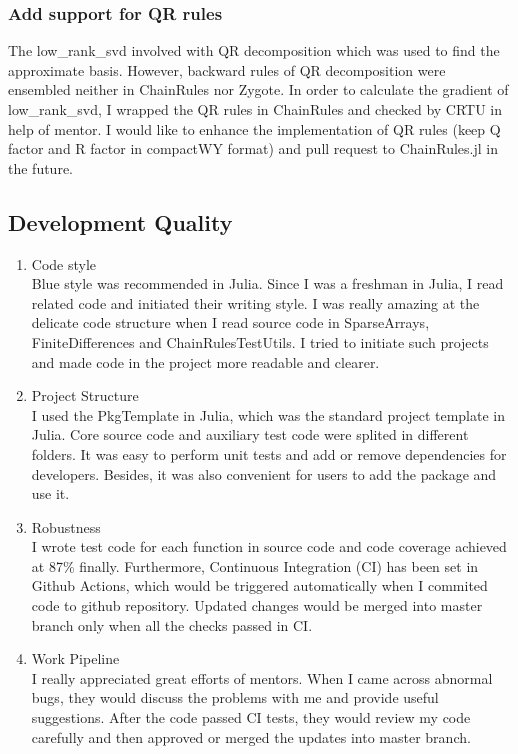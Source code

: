 \subsubsection{Add support for QR rules}
The low\_rank\_svd involved with QR decomposition which was used to find the approximate basis. 
However, backward rules of QR decomposition were ensembled neither in ChainRules nor Zygote. In order to 
calculate the gradient of low\_rank\_svd, I wrapped the QR rules in ChainRules and checked by CRTU in help of mentor. 
I would like to enhance the implementation of QR rules (keep Q factor and R factor in compactWY format) and pull request to 
ChainRules.jl in the future. 
\subsection{Development Quality}
\begin{enumerate}
    \item Code style  \\
    Blue style was recommended in Julia. Since I was a freshman in Julia, I
    read related code and initiated their writing style. I was really amazing at 
    the delicate code structure when I read source code in SparseArrays, FiniteDifferences 
    and ChainRulesTestUtils. I tried to initiate such projects and made code in the project more 
    readable and clearer.   
    \item Project Structure \\
    I used the PkgTemplate in Julia, which was the standard project template in Julia. 
    Core source code and auxiliary test code were splited in different folders. It was easy to 
    perform unit tests and add or remove dependencies for developers. Besides, it was also 
    convenient for users to add the package and use it. 
    \item Robustness \\
    I wrote test code for each function in source code and code coverage achieved at 87\% finally. Furthermore, Continuous Integration (CI)
    has been set in Github Actions, which would be triggered automatically when I commited code to 
    github repository. Updated changes would be merged into master branch only when all the checks 
    passed in CI.   
    \item Work Pipeline \\
    I really appreciated great efforts of mentors. When I came across abnormal bugs, they would discuss the problems with me 
    and provide useful suggestions. After the code passed CI tests, they would review my code carefully and then approved or merged the 
    updates into master branch. 
\end{enumerate}



